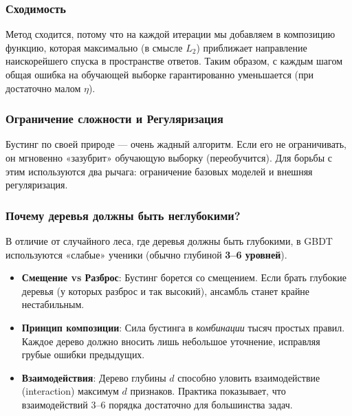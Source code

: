 \documentclass[12pt]{article}
\begin{document}
\subsubsection{Сходимость}
Метод сходится, потому что на каждой итерации мы добавляем в композицию функцию, которая максимально (в смысле $L_2$) приближает направление наискорейшего спуска в пространстве ответов. Таким образом, с каждым шагом общая ошибка на обучающей выборке гарантированно уменьшается (при достаточно малом $\eta$).

\subsubsection{Ограничение сложности и Регуляризация}
Бустинг по своей природе — очень жадный алгоритм. Если его не ограничивать, он мгновенно «зазубрит» обучающую выборку (переобучится). Для борьбы с этим используются два рычага: ограничение базовых моделей и внешняя регуляризация.

\subsubsection{Почему деревья должны быть неглубокими?}
В отличие от случайного леса, где деревья должны быть глубокими, в GBDT используются «слабые» ученики (обычно глубиной \textbf{3–6 уровней}).
\begin{itemize}
    \item \textbf{Смещение vs Разброс}: Бустинг борется со смещением. Если брать глубокие деревья (у которых разброс и так высокий), ансамбль станет крайне нестабильным.
    \item \textbf{Принцип композиции}: Сила бустинга в \textit{комбинации} тысяч простых правил. Каждое дерево должно вносить лишь небольшое уточнение, исправляя грубые ошибки предыдущих.
    \item \textbf{Взаимодействия}: Дерево глубины $d$ способно уловить взаимодействие (interaction) максимум $d$ признаков. Практика показывает, что взаимодействий 3–6 порядка достаточно для большинства задач.
\end{itemize}
\end{document}

